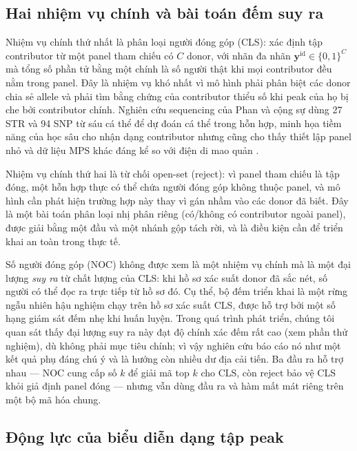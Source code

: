 \documentclass[12pt,a4paper]{article}
\begin{document}
\subsection{Hai nhiệm vụ chính và bài toán đếm suy ra}

Nhiệm vụ chính thứ nhất là phân loại người đóng góp (CLS): xác định tập contributor từ một panel tham chiếu có \(C\) donor, với nhãn đa nhãn \(\bm{y}^{\mathrm{id}}\in\{0,1\}^{C}\) mà tổng số phần tử bằng một chính là số người thật khi mọi contributor đều nằm trong panel. Đây là nhiệm vụ khó nhất vì mô hình phải phân biệt các donor chia sẻ allele và phải tìm bằng chứng của contributor thiểu số khi peak của họ bị che bởi contributor chính. Nghiên cứu sequencing của Phan và cộng sự dùng 27 STR và 94 SNP từ sáu cá thể để dự đoán cá thể trong hỗn hợp, minh họa tiềm năng của học sâu cho nhận dạng contributor nhưng cũng cho thấy thiết lập panel nhỏ và dữ liệu MPS khác đáng kể so với điện di mao quản \cite{phan2021}.

Nhiệm vụ chính thứ hai là từ chối open-set (reject): vì panel tham chiếu là tập đóng, một hỗn hợp thực có thể chứa người đóng góp không thuộc panel, và mô hình cần phát hiện trường hợp này thay vì gán nhầm vào các donor đã biết. Đây là một bài toán phân loại nhị phân riêng (có/không có contributor ngoài panel), được giải bằng một đầu và một nhánh gộp tách rời, và là điều kiện cần để triển khai an toàn trong thực tế.

Số người đóng góp (NOC) không được xem là một nhiệm vụ chính mà là một đại lượng \emph{suy ra} từ chất lượng của CLS: khi hồ sơ xác suất donor đã sắc nét, số người có thể đọc ra trực tiếp từ hồ sơ đó. Cụ thể, bộ đếm triển khai là một rừng ngẫu nhiên hậu nghiệm chạy trên hồ sơ xác suất CLS, được hỗ trợ bởi một số hạng giám sát đếm nhẹ khi huấn luyện. Trong quá trình phát triển, chúng tôi quan sát thấy đại lượng suy ra này đạt độ chính xác đếm rất cao (xem phần thử nghiệm), dù không phải mục tiêu chính; vì vậy nghiên cứu báo cáo nó như một kết quả phụ đáng chú ý và là hướng còn nhiều dư địa cải tiến. Ba đầu ra hỗ trợ nhau — NOC cung cấp số \(k\) để giải mã top \(k\) cho CLS, còn reject bảo vệ CLS khỏi giả định panel đóng — nhưng vẫn dùng đầu ra và hàm mất mát riêng trên một bộ mã hóa chung.

\subsection{Động lực của biểu diễn dạng tập peak}
\end{document}
